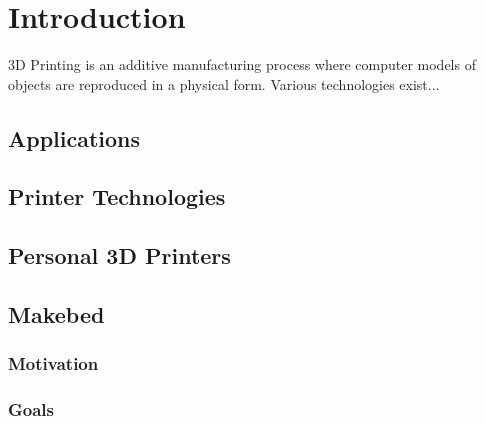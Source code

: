 \chapter{Introduction}
	
	3D Printing is an additive manufacturing process where computer models of
	objects are reproduced in a physical form. Various technologies exist...
	
	\section{Applications}
	
	\section{Printer Technologies}
	
	\section{Personal 3D Printers}
	
	\section{Makebed}
	
		\subsection{Motivation}
		
		\subsection{Goals}
